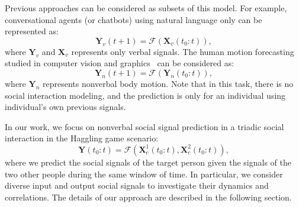 Previous approaches can be considered as subsets of this model. For example, conversational agents (or chatbots) using natural language only can be represented as:
\begin{equation}
\mathbf{Y}_v (t+1) =  \mathcal{F} \left( \mathbf{X}_v (t_0:t) \right),
\end{equation}
where $\mathbf{Y}_v$ and $\mathbf{X}_v$ represents only verbal signals. The human motion forecasting studied in computer vision and graphics~\cite{Fragkiadaki_2015_ICCV, jain2016structural} can be considered as:
\begin{equation}
\mathbf{Y}_n (t+1) =  \mathcal{F} \left( \mathbf{Y}_n (t_0:t) \right),
\end{equation}
where $\mathbf{Y}_n$ represents nonverbal body motion. Note that in this task, there is no social interaction modeling, and the prediction is only for an individual using individual's own previous signals. 

In our work, we focus on nonverbal social signal prediction in a triadic social interaction in the Haggling game scenario:
\begin{equation}
\mathbf{Y} ( t_0:t ) =  \mathcal{F} \left( \mathbf{X}_c^1 (t_0:t), \mathbf{X}_c^2 (t_0:t) \right),
\label{equation:F_ours}
\end{equation}
where we predict the social signals of the target person given the signals of the two other people during the same window of time. In particular, we consider diverse input and output social signals to investigate their dynamics and correlations. The details of our approach are described in the following section.


